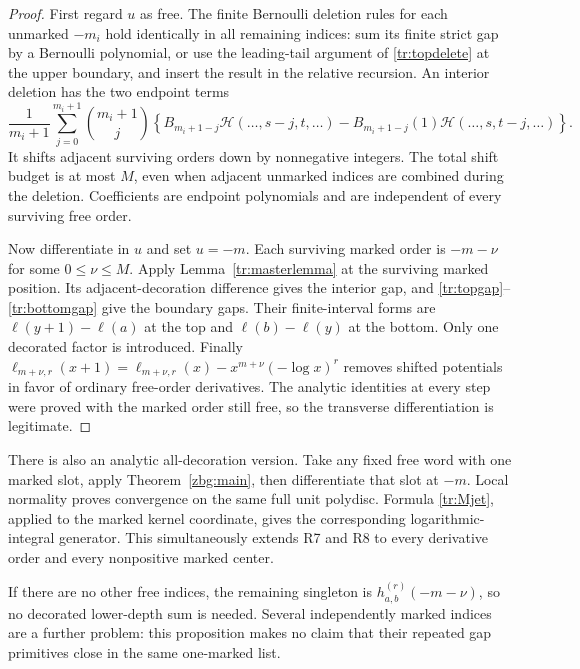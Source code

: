 \documentclass[11pt,letterpaper]{article}
\numberwithin{equation}{section}
\theoremstyle{plain}
\theoremstyle{definition}
\theoremstyle{remark}
\newcommand{\HH}{\mathcal H}
\begin{document}
\begin{proof}
First regard $u$ as free. The finite Bernoulli deletion rules for each
unmarked $-m_i$ hold identically in all remaining indices: sum its
finite strict gap by a Bernoulli polynomial, or use the leading-tail
argument of \eqref{tr:topdelete} at the upper boundary, and insert the
result in the relative recursion. An interior deletion has the two
endpoint terms
\[
 \frac1{m_i+1}\sum_{j=0}^{m_i+1}\binom{m_i+1}{j}
 \left\{B_{m_i+1-j}\HH(\ldots,s-j,t,\ldots)
       -B_{m_i+1-j}(1)\HH(\ldots,s,t-j,\ldots)\right\}.
\]
It shifts adjacent surviving orders down by nonnegative integers.
The total shift budget is at most $M$, even when adjacent unmarked
indices are combined during the deletion. Coefficients are endpoint
polynomials and are independent of every surviving free order.

Now differentiate in $u$ and set $u=-m$. Each surviving marked order
is $-m-\nu$ for some $0\leq\nu\leq M$.
Apply Lemma~\ref{tr:masterlemma} at the surviving marked position.
Its adjacent-decoration difference gives the interior gap, and
\eqref{tr:topgap}--\eqref{tr:bottomgap} give the boundary gaps.
Their finite-interval forms are
$\ell(y+1)-\ell(a)$ at the top and
$\ell(b)-\ell(y)$ at the bottom. Only one decorated factor is introduced.
Finally
$\ell_{m+\nu,r}(x+1)=\ell_{m+\nu,r}(x)
                   -x^{m+\nu}(-\log x)^r$
removes shifted potentials in favor of ordinary free-order derivatives.
The analytic identities at every step were proved with the marked
order still free, so the transverse differentiation is legitimate.
\end{proof}

There is also an analytic all-decoration version. Take any fixed
free word with one marked slot, apply Theorem~\ref{zbg:main}, then
differentiate that slot at $-m$. Local normality proves convergence on
the same full unit polydisc. Formula \eqref{tr:Mjet}, applied to the
marked kernel coordinate, gives the corresponding logarithmic-integral
generator. This simultaneously extends R7 and R8 to every derivative
order and every nonpositive marked center.

If there are no other free indices, the remaining singleton is
$h_{a,b}^{(r)}(-m-\nu)$, so no decorated lower-depth sum is needed.
Several independently marked indices are a further problem: this
proposition makes no claim that their repeated gap primitives close
in the same one-marked list.


\end{document}
